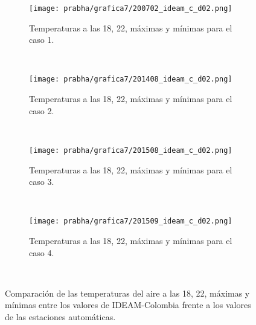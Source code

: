 \begin{figure}[H]
    \centering
    \begin{subfigure}[b]{0.45\textwidth}
        \caption{Temperaturas a las 18, 22, máximas y mínimas para el caso 1.}
	\texttt{[image: prabha/grafica7/200702\_ideam\_c\_d02.png]}
    \label{subfig:tmp_ext_caso1_d01_ideamcol}
	\end{subfigure}
	~
	    \begin{subfigure}[b]{0.45\textwidth}
        \caption{Temperaturas a las 18, 22, máximas y mínimas para el caso 2.}
	\texttt{[image: prabha/grafica7/201408\_ideam\_c\_d02.png]}

    \label{subfig:tmp_ext_caso2_d01_ideamcol}
	\end{subfigure}
	~
	    \begin{subfigure}[b]{0.45\textwidth}
        \caption{Temperaturas a las 18, 22, máximas y mínimas para el caso 3.}
	\texttt{[image: prabha/grafica7/201508\_ideam\_c\_d02.png]}
    \label{subfig:tmp_ext_caso3_d01_ideamcol}
	\end{subfigure}
	~
	    \begin{subfigure}[b]{0.45\textwidth}
        \caption{Temperaturas a las 18, 22, máximas y mínimas para el caso 4.}
	\texttt{[image: prabha/grafica7/201509\_ideam\_c\_d02.png]}
    
    \label{subfig:tmp_ext_caso4_d01_ideamcol}
	\end{subfigure}
	~

\caption{Comparación de las temperaturas del aire a las 18, 22, máximas y mínimas entre los valores de IDEAM-Colombia frente a los valores de las estaciones automáticas.}	
\label{subfig:ideam_colombia}	
\end{figure}



